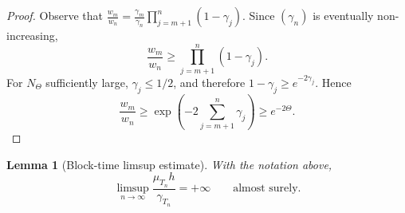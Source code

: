 \documentclass[10pt,letterpaper]{article}
\theoremstyle{compactplain}
\newtheorem{lemma}[theorem]{Lemma}
\theoremstyle{compactdefinition}
\newcommand{\1}{\mathds{1}}
\begin{document}
\begin{proof}
Observe that
\(
\frac{w_m}{w_n}
=
\frac{\gamma_m}{\gamma_n}
\prod\limits_{j=m+1}^n(1-\gamma_j).
\)
Since \((\gamma_n)\) is eventually non-increasing, 
\[
\frac{w_m}{w_n}
\geq \prod_{j=m+1}^n(1-\gamma_j) .\] For \(N_\Theta\) sufficiently large, \(\gamma_j\leq1/2\), and therefore
\(1-\gamma_j\geq e^{-2\gamma_j}\). Hence
\[
\frac{w_m}{w_n}
\geq
\exp\left(-2\sum_{j=m+1}^n\gamma_j\right)
\geq e^{-2\Theta}.
\]
\end{proof}

\begin{lemma}[Block-time limsup estimate]
\label{lem:block-time-limsup}
With the notation above,
\[
\limsup_{n\to\infty}
\frac{\mu_{T_n}h}{\gamma_{T_n}}
=
+\infty
\qquad\text{almost surely}.
\]
\end{lemma}
\end{document}
